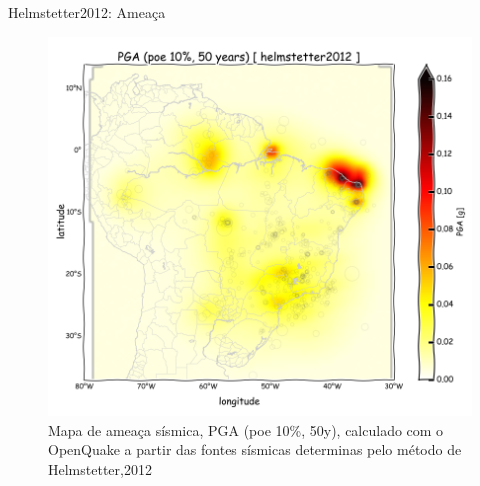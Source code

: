 \documentclass[ucs,8pt]{beamer}
\begin{document}
\begin{frame}{Helmstetter2012: Ameaça}
\begin{figure}[H]
  \centering
  \includegraphics[height=.93\textheight]{pga_helmstetter} 
  \caption{Mapa de ameaça sísmica, PGA (poe 10\%, 50y), 
  		   calculado com o OpenQuake a partir das fontes sísmicas
  		   determinas pelo método de Helmstetter,2012 }
  \label{fig:helm_h} 
\end{figure}
\end{frame}




\end{document}
